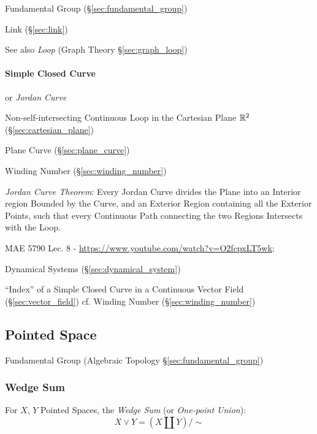 Fundamental Group (\S\ref{sec:fundamental_group})

Link (\S\ref{sec:link})

\fist See also \emph{Loop} (Graph Theory \S\ref{sec:graph_loop})



\paragraph{Simple Closed Curve}\label{sec:simple_closed_curve}\hfill

or \emph{Jordan Curve}

Non-self-intersecting Continuous Loop in the Cartesian Plane $\mathbb{R}^2$
(\S\ref{sec:cartesian_plane})

\fist Plane Curve (\S\ref{sec:plane_curve})

Winding Number (\S\ref{sec:winding_number})

\emph{Jordan Curve Theorem}: Every Jordan Curve divides the Plane into an
Interior region Bounded by the Curve, and an Exterior Region containing all the
Exterior Points, such that every Continuous Path connecting the two Regions
Intersects with the Loop.


MAE 5790 Lec. 8 - \url{https://www.youtube.com/watch?v=O2fcpxLT5wk}:

\fist Dynamical Systems (\S\ref{sec:dynamical_system})

``Index'' of a Simple Closed Curve in a Continuous Vector Field
(\S\ref{sec:vector_field}) \fist cf. Winding Number
(\S\ref{sec:winding_number})



\subsection{Pointed Space}\label{sec:pointed_space}

\fist Fundamental Group (Algebraic Topology \S\ref{sec:fundamental_group})



\subsubsection{Wedge Sum}\label{sec:wedge_sum}

For $X$, $Y$ Pointed Spaces, the \emph{Wedge Sum} (or \emph{One-point
  Union}):
\[
  X \vee Y = (X \amalg Y) / \sim
\]

